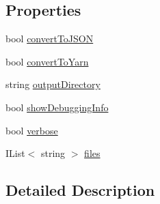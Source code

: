\subsection*{Properties}
\begin{DoxyCompactItemize}
\item 
bool \hyperlink{a00036_a6a650914fcde92ba06fb5f140af27f11}{convert\-To\-J\-S\-O\-N}
\item 
bool \hyperlink{a00036_a052d6f00647c503adc5a79a1ff92cdf4}{convert\-To\-Yarn}
\item 
string \hyperlink{a00036_ab636bde93c2204b2af1a9306560d9749}{output\-Directory}
\item 
bool \hyperlink{a00020_a89964ea17bd19caf00cb5bff563ed01c}{show\-Debugging\-Info}
\item 
bool \hyperlink{a00020_ada4d83d1756918f362d55f6649b82b17}{verbose}
\item 
I\-List$<$ string $>$ \hyperlink{a00020_aa93cbb1bc1d5328e0a417012621e92d2}{files}
\end{DoxyCompactItemize}


\subsection{Detailed Description}


